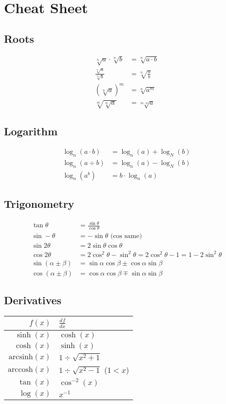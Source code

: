 \section{Cheat Sheet}
\subsection{Roots}

\begin{align*}
	\sqrt[n]{a}\cdot\sqrt[n]{b} & = \sqrt[n]{a\cdot b} \\
	\frac{\sqrt[n]{a}}{\sqrt[n]{b}} & = \sqrt[n]{\frac{a}{b}} \\
	(\sqrt[n]{a})^m & = \sqrt[n]{a^m} \\
	\sqrt[m]{\sqrt[n]{a}} & = \sqrt[m\cdot n]{a}
\end{align*}


\subsection{Logarithm}

\begin{align*}
	\log_n(a\cdot b) & = \log_n(a) + \log_N(b) \\
	\log_n(a\div b) & = \log_n(a) - \log_N(b) \\
	\log_n(a^b) & = b \cdot \log_n(a)
\end{align*}

\subsection{Trigonometry}

\begin{align*}
	\tan\theta & = \frac{\sin\theta}{\cos\theta} \\
	\sin -\theta & = -\sin\theta\text{ (cos same)} \\
	\sin 2\theta & = 2\sin\theta\cos\theta \\
	\cos 2\theta & = 2\cos^2\theta - \sin^2\theta = 2\cos^2\theta - 1 = 1 - 2\sin^2\theta \\
	\sin(\alpha \pm \beta) & = \sin\alpha\cos\beta\pm\cos\alpha\sin\beta \\
	\cos(\alpha\pm\beta) & = \cos\alpha\cos\beta \mp \sin\alpha\sin\beta
\end{align*}

\subsection{Derivatives}
\begin{tabular}{r|l}
	$f(x)$ & $\frac{df}{dx}$ \\
	\hline
	$\sinh(x)$ & $\cosh(x)$ \\
	$\cosh(x)$ & $\sinh(x)$ \\
	$\mathrm{arcsinh}(x)$ & $1 \div \sqrt{x^2+1}$ \\
	$\mathrm{arccosh}(x)$ & $1 \div \sqrt{x^2 - 1}$ ($1<x$) \\
	$\tan(x)$ & $\cos^{-2}(x)$ \\
	$\log(x)$ & $x^{-1}$
\end{tabular}


